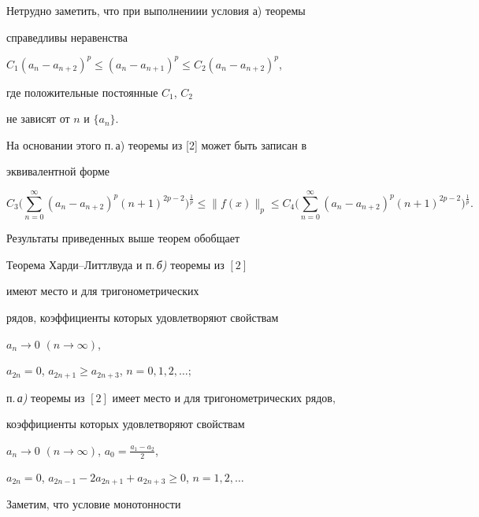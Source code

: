 Нетрудно заметить, что при выполнениии условия а) теоремы


справедливы неравенства


$C_1(a_n-a_{n+2})^p\leq (a_n-a_{n+1})^p\leq C_2(a_n-a_{n+2})^p$,


где положительные постоянные $C_1$, $C_2$ 


не зависят от $n$ и $\{a_n\}$. 


На основании этого п.\,а) теоремы из [2] может быть записан в


эквивалентной форме


\begin{equation}


C_3\bigg(\sum\limits_{n=0}^{\infty}(a_n-a_{n+2})^p(n+1)^{2p-2}


\bigg)^{\frac{1}{p}}


\leq \|f(x)\|_p \leq 


C_4 \bigg(\sum\limits_{n=0}^{\infty}(a_n-


a_{n+2})^p(n+1)^{2p-2}\bigg)^{\frac{1}{p}}.


\end{equation}





Результаты приведенных выше теорем обобщает





\begin{assrt}


Теорема Харди--Литтлвуда и п.\,{\em б)} теоремы из $[2]$


имеют место и для тригонометрических


рядов, коэффициенты которых удовлетворяют свойствам


$a_n{\to} 0$ $(n{\to} \infty)$,


$a_{2n}=0$, $a_{2n+1}\geq a_{2n+3}$, $n=0,1,2,\dotsc;$


п.\,{\em а)} теоремы из $[2]$ имеет место и для тригонометрических рядов,


коэффициенты которых удовлетворяют свойствам


$a_n\to 0$ $(n\to \infty)$, $a_0=\frac{a_1-a_2}{2}$,


$a_{2n}=0$, $a_{2n-1}-2a_{2n+1}+ a_{2n+3}\geq 0$, $n=1,2,\dotsc$


\end{assrt}





Заметим, что условие монотонности 


